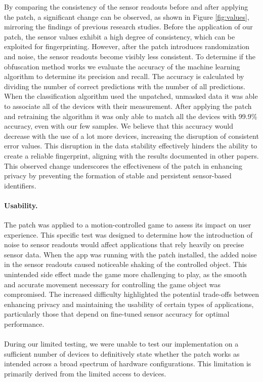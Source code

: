 \documentclass[11pt,
  oneside,openany,    %
]{scrreprt}
\begin{document}
By comparing the consistency of the sensor readouts before and after applying the patch, a significant change can be observed, as shown in Figure \ref{fig:values}, mirroring the findings of previous research studies. 
Before the application of our patch, the sensor values exhibit a high degree of consistency, which can be exploited for fingerprinting.
However, after the patch introduces randomization and noise, the sensor readouts become visibly less consistent.
To determine if the obfuscation method works we evaluate the accuracy of the machine learning algorithm to determine its precision and recall.
The accuracy is calculated by dividing the number of correct predictions with the number of all predictions.
When the classification algorithm used the unpatched, unmasked data it was able to associate all of the devices with their measurement.
After applying the patch and retraining the algorithm it was only able to match all the devices with 99.9\% accuracy, even with our few samples. 
We believe that this accuracy would decrease with the use of a lot more devices, increasing the disruption of consistent error values.
This disruption in the data stability effectively hinders the ability to create a reliable fingerprint, aligning with the results documented in other papers.
This observed change underscores the effectiveness of the patch in enhancing privacy by preventing the formation of stable and persistent sensor-based identifiers.

\paragraph{Usability.}
\label{par:usability}
The patch was applied to a motion-controlled game \cite{krassesSpiel} to assess its impact on user experience.
This specific test was designed to determine how the introduction of noise to sensor readouts would affect applications that rely heavily on precise sensor data.
When the app was running with the patch installed, the added noise in the sensor readouts caused noticeable shaking of the controlled object.
This unintended side effect made the game more challenging to play, as the smooth and accurate movement necessary for controlling the game object was compromised.
The increased difficulty highlighted the potential trade-offs between enhancing privacy and maintaining the usability of certain types of applications, particularly those that depend on fine-tuned sensor accuracy for optimal performance.

\paragraph{}
During our limited testing, we were unable to test our implementation on a sufficient number of devices to definitively state whether the patch works as intended across a broad spectrum of hardware configurations.
This limitation is primarily derived from the limited access to devices.
\end{document}
